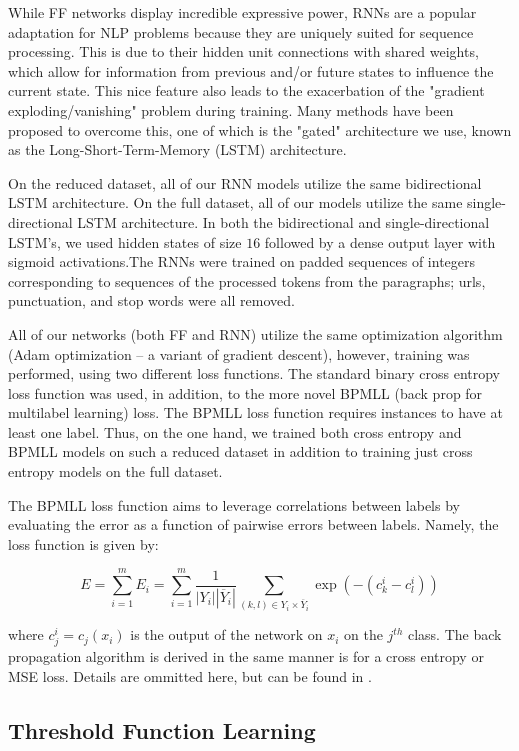 \documentclass[11pt]{article}
\begin{document}
While FF networks display incredible expressive power, RNNs are a popular adaptation for NLP problems because they are uniquely suited for sequence processing. This is due to their hidden unit connections with shared weights, which allow for information from previous and/or future states to influence the current state. This nice feature also leads to the exacerbation of the "gradient exploding/vanishing" problem during training. Many methods have been proposed to overcome this, one of which is the "gated" architecture we use, known as the Long-Short-Term-Memory (LSTM) architecture. 

On the reduced dataset, all of our RNN models utilize the same bidirectional LSTM architecture. On the full dataset, all of our models utilize the same single-directional LSTM architecture. In both the bidirectional and single-directional LSTM's, we used hidden states of size $16$ followed by a dense output layer with sigmoid activations.The RNNs were trained on padded sequences of integers corresponding to sequences of the processed tokens from the paragraphs; urls, punctuation, and stop words were all removed. 

All of our networks (both FF and RNN) utilize the same optimization algorithm (Adam optimization -- a variant of gradient descent), however, training was performed, using two different loss functions. The standard binary cross entropy loss function was used, in addition, to the more novel BPMLL (back prop for multilabel learning) loss. The BPMLL loss function requires instances to have at least one label. Thus, on the one hand, we trained both cross entropy and BPMLL models on such a reduced dataset in addition to training just cross entropy models on the full dataset. 

The BPMLL loss function aims to leverage correlations between labels by evaluating the error as a function of pairwise errors between labels. Namely, the loss function is given by:

$$
    E = \sum_{i = 1}^m E_i = \sum_{i = 1}^m \frac{1}{|Y_i| |\overline{Y}_i|} \sum_{(k,l) \in Y_i \times \overline{Y}_i} \exp(-(c_k^i - c_l^i))
$$

where $c_j^i = c_j(x_i)$ is the output of the network on $x_i$ on the $j^{th}$ class. The back propagation algorithm is derived in the same manner is for a cross entropy or MSE loss. Details are ommitted here, but can be found in \autocite{bpmll}.
  
\subsection{Threshold Function Learning}
\end{document}
